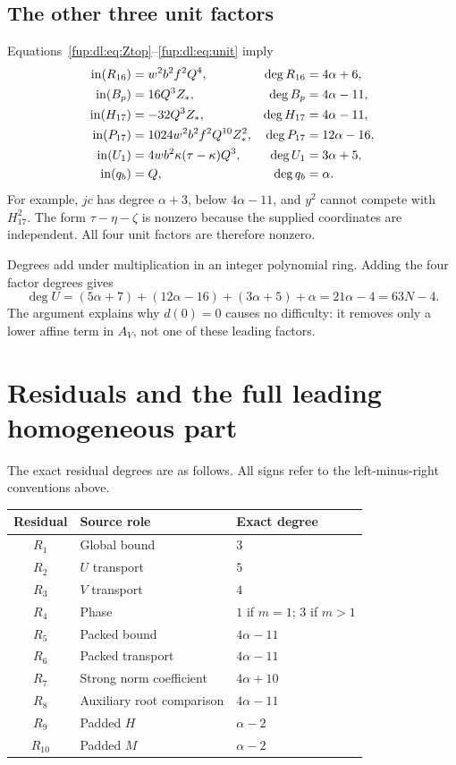 \documentclass[11pt,letterpaper]{article}
\theoremstyle{definition}\newtheorem{definition}[theorem]{Definition}
\theoremstyle{remark}\newtheorem{remark}[theorem]{Remark}
\newcommand{\topf}[1]{\operatorname{in}(#1)}
\begin{document}
\subsection{The other three unit factors}
Equations~\eqref{fup:dl:eq:Ztop}--\eqref{fup:dl:eq:unit} imply
\begin{align}
 \topf{R_{16}}&=w^2b^2f^2Q^4,&\deg R_{16}&=4\alpha+6,\notag\\
 \topf{B_p}&=16Q^3Z_*,&\deg B_p&=4\alpha-11,\notag\\
 \topf{H_{17}}&=-32Q^3Z_*,&\deg H_{17}&=4\alpha-11,\notag\\
 \topf{P_{17}}&=1024w^2b^2f^2Q^{10}Z_*^2,
 &\deg P_{17}&=12\alpha-16,\notag\\
 \topf{U_1}&=4wb^2\kappa(\tau-\kappa)Q^3,
 &\deg U_1&=3\alpha+5,\notag\\
 \topf{q_b}&=Q,&\deg q_b&=\alpha.\label{fup:dl:eq:othertops}
\end{align}
For example, $jc$ has degree $\alpha+3$, below $4\alpha-11$, and $y^2$ cannot compete with $H_{17}^2$. The form $\tau-\eta-\zeta$ is nonzero because the supplied coordinates are independent. All four unit factors are therefore nonzero.

Degrees add under multiplication in an integer polynomial ring. Adding the four factor degrees gives
\begin{equation}\label{fup:dl:eq:unitdegree}
 \deg U=(5\alpha+7)+(12\alpha-16)+(3\alpha+5)+\alpha
       =21\alpha-4=63N-4.
\end{equation}
The argument explains why $d(0)=0$ causes no difficulty: it removes only a lower affine term in $A_V$, not one of these leading factors.

\section{Residuals and the full leading homogeneous part}\label{fup:dl:sec:residuals}
The exact residual degrees are as follows. All signs refer to the left-minus-right conventions above.
\begin{center}
\begin{tabular}{cll}
\toprule
Residual & Source role & Exact degree\\\midrule
$R_1$ & Global bound & $3$\\
$R_2$ & $U$ transport & $5$\\
$R_3$ & $V$ transport & $4$\\
$R_4$ & Phase & $1$ if $m=1$; $3$ if $m>1$\\
$R_5$ & Packed bound & $4\alpha-11$\\
$R_6$ & Packed transport & $4\alpha-11$\\
$R_7$ & Strong norm coefficient & $4\alpha+10$\\
$R_8$ & Auxiliary root comparison & $4\alpha-11$\\
$R_9$ & Padded $H$ & $\alpha-2$\\
$R_{10}$ & Padded $M$ & $\alpha-2$\\\bottomrule
\end{tabular}
\end{center}
\end{document}
